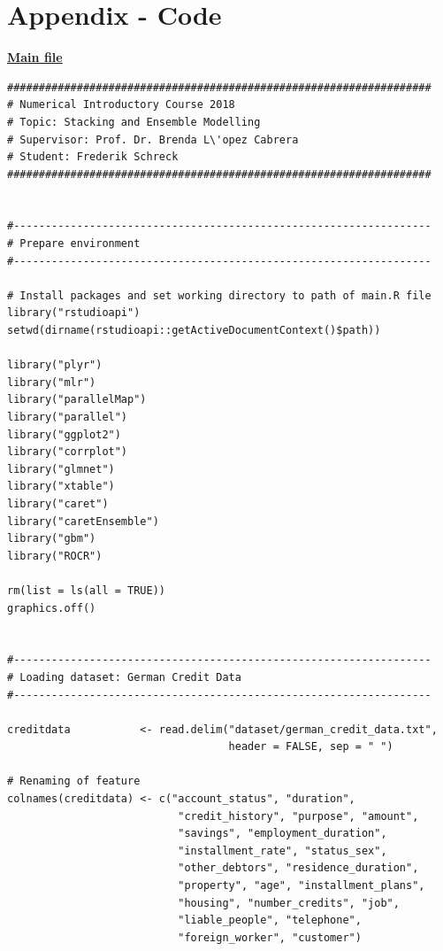 \documentclass[12pt]{article}
\begin{document}
\clearpage

\section{Appendix - Code}
\begin{algorithm}
\caption[Quantlet 1: Main file]{\href{https://github.com/schreckf/NIC_Schreck/blob/master/code}{\large\textbf{Main file}}}
\end{algorithm}

\begin{lstlisting}
###################################################################
# Numerical Introductory Course 2018
# Topic: Stacking and Ensemble Modelling
# Supervisor: Prof. Dr. Brenda L\'opez Cabrera
# Student: Frederik Schreck
###################################################################


#------------------------------------------------------------------
# Prepare environment
#------------------------------------------------------------------

# Install packages and set working directory to path of main.R file
library("rstudioapi")
setwd(dirname(rstudioapi::getActiveDocumentContext()$path))

library("plyr")
library("mlr")
library("parallelMap")
library("parallel")
library("ggplot2")
library("corrplot")
library("glmnet")
library("xtable")
library("caret")
library("caretEnsemble")
library("gbm")
library("ROCR")

rm(list = ls(all = TRUE))
graphics.off()


#------------------------------------------------------------------
# Loading dataset: German Credit Data
#------------------------------------------------------------------

creditdata           <- read.delim("dataset/german_credit_data.txt", 
                                   header = FALSE, sep = " ")

# Renaming of feature
colnames(creditdata) <- c("account_status", "duration", 
                           "credit_history", "purpose", "amount", 
                           "savings", "employment_duration", 
                           "installment_rate", "status_sex", 
                           "other_debtors", "residence_duration", 
                           "property", "age", "installment_plans", 
                           "housing", "number_credits", "job", 
                           "liable_people", "telephone", 
                           "foreign_worker", "customer")



\end{lstlisting}
\end{document}
